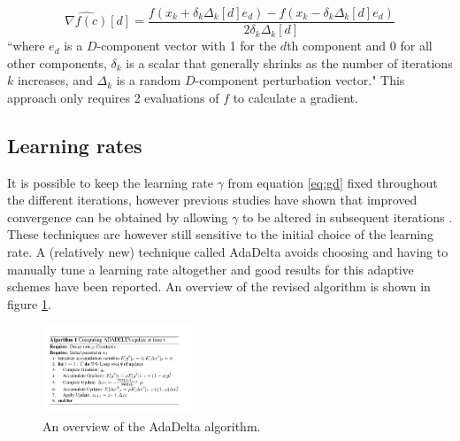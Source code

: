\begin{equation}
 \hat{\nabla f(c)}[d] = \frac{f(x_k + \delta_k\Delta_k[d]e_d) - f(x_k - \delta_k\Delta_k[d]e_d)}{2\delta_k\Delta_k[d]}
\end{equation}
``where $e_d$ is a $D$-component vector with 1 for the $d$th component and 0 for all other components, $\delta_k$ is a 
scalar that generally shrinks as the number of iterations $k$ increases, and $\Delta_k$ is a random $D$-component perturbation
vector."
This approach only requires 2 evaluations of $f$ to calculate a gradient.

 
\subsection{Learning rates}
It is possible to keep the learning rate $\gamma$ from equation \ref{eq:gd} fixed throughout the different iterations, however previous studies have shown that improved convergence can be obtained by allowing
$\gamma$ to be altered in subsequent iterations \cite{jacobs1988increased}. These techniques are however still sensitive to the initial choice of the learning rate. A (relatively new) technique called AdaDelta\cite{zeiler2012adadelta}
avoids choosing and having to manually tune a learning rate altogether and good results for this adaptive schemes have been reported. An overview of the revised algorithm is shown in figure \ref{fig:adadelta}.
\begin{figure}	
    \centering
    \includegraphics[width=0.4\textwidth]{images/ada_delta.png}
    \caption{ An overview of the AdaDelta algorithm. }
    \label{fig:adadelta}
\end{figure}


